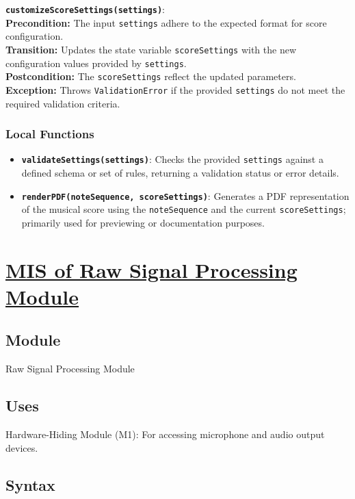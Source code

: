 \documentclass[12pt, titlepage]{article}
\begin{document}
\vspace{2mm}
\noindent \textbf{\texttt{customizeScoreSettings(settings)}}: \\
\textbf{Precondition:} The input \texttt{settings} adhere to the expected format for score configuration. \\
\textbf{Transition:} Updates the state variable \texttt{scoreSettings} with the new configuration values provided by \texttt{settings}. \\
\textbf{Postcondition:} The \texttt{scoreSettings} reflect the updated parameters. \\
\textbf{Exception:} Throws \texttt{ValidationError} if the provided \texttt{settings} do not meet the required validation criteria.

\subsubsection{Local Functions}
\begin{itemize}
    \item \textbf{\texttt{validateSettings(settings)}}: Checks the provided \texttt{settings} against a defined schema or set of rules, returning a validation status or error details.
    \item \textbf{\texttt{renderPDF(noteSequence, scoreSettings)}}: Generates a PDF representation of the musical score using the \texttt{noteSequence} and the current \texttt{scoreSettings}; primarily used for previewing or documentation purposes.
\end{itemize}


\section{\hyperref[mRSM]{MIS of Raw Signal Processing Module}} \label{M4}  

\subsection{Module}  
Raw Signal Processing Module  

\subsection{Uses}  
Hardware-Hiding Module (M1): For accessing microphone and audio output devices. 

\subsection{Syntax}  
\end{document}
